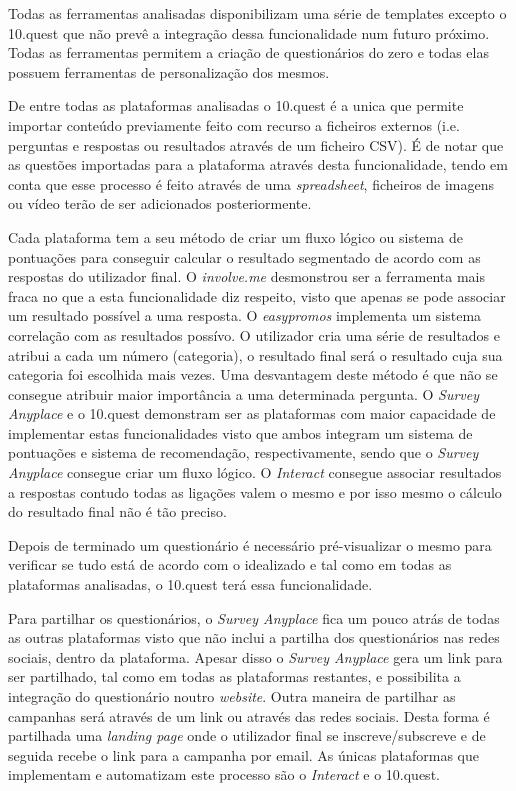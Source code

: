 Todas as ferramentas analisadas disponibilizam uma série de templates excepto o 10.quest que não prevê a integração dessa funcionalidade num futuro próximo. Todas as ferramentas permitem a criação de questionários do zero e todas elas possuem ferramentas de personalização dos mesmos.

De entre todas as plataformas analisadas o 10.quest é a unica que permite importar conteúdo previamente feito com recurso a ficheiros externos (i.e. perguntas e respostas ou resultados através de um ficheiro CSV). É de notar que as questões importadas para a plataforma através desta funcionalidade, tendo em conta que esse processo é feito através de uma \textit{spreadsheet}, ficheiros de imagens ou vídeo terão de ser adicionados posteriormente.

Cada plataforma tem a seu método de criar um fluxo lógico ou sistema de pontuações para conseguir calcular o resultado segmentado de acordo com as respostas do utilizador final. O \textit{involve.me} desmonstrou ser a ferramenta mais fraca no que a esta funcionalidade diz respeito, visto que apenas se pode associar um resultado possível a uma resposta. O \textit{easypromos} implementa um sistema correlação com as resultados possívo. O utilizador cria uma série de resultados e atribui a cada um número (categoria), o resultado final será o resultado cuja sua categoria foi escolhida mais vezes. Uma desvantagem deste método é que não se consegue atribuir maior importância a uma determinada pergunta. O \textit{Survey Anyplace} e o 10.quest demonstram ser as plataformas com maior capacidade de implementar estas funcionalidades visto que ambos integram um sistema de pontuações e sistema de recomendação, respectivamente, sendo que o \textit{Survey Anyplace} consegue criar um fluxo lógico. O \textit{Interact} consegue associar resultados a respostas contudo todas as ligações valem o mesmo e por isso mesmo o cálculo do resultado final não é tão preciso.


Depois de terminado um questionário é necessário pré-visualizar o mesmo para verificar se tudo está de acordo com o idealizado e tal como em todas as plataformas analisadas, o 10.quest terá essa funcionalidade.

Para partilhar os questionários, o \textit{Survey Anyplace} fica um pouco atrás de todas as outras plataformas visto que não inclui a partilha dos questionários nas redes sociais, dentro da plataforma. Apesar disso o \textit{Survey Anyplace} gera um link para ser partilhado, tal como em todas as plataformas restantes, e possibilita a integração do questionário noutro \textit{website}. 
Outra maneira de partilhar as campanhas será através de um link ou através das redes sociais. Desta forma é partilhada uma \textit{landing page} onde o utilizador final se inscreve/subscreve e de seguida recebe o link para a campanha por email. As únicas plataformas que implementam e automatizam este processo são o \textit{Interact} e o 10.quest.

